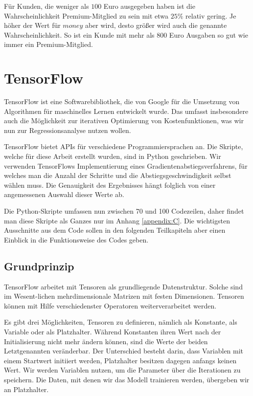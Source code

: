 Für Kunden, die weniger als $100$ Euro ausgegeben haben ist die Wahrscheinlichkeit Premium-Mitglied zu sein mit etwa $25\%$ relativ gering. Je höher der Wert für $money$ aber wird, desto größer wird auch die genannte Wahrscheinlichkeit. So ist ein Kunde mit mehr als $800$ Euro Ausgaben so gut wie immer ein Premium-Mitglied.

\section{TensorFlow}
\label{section:3:3}

TensorFlow ist eine Softwarebibliothek, die von Google für die Umsetzung von Algorithmen für maschinelles Lernen entwickelt wurde. Das umfasst insbesondere auch die Möglichkeit zur iterativen Optimierung von Kostenfunktionen, was wir nun zur Regressionsanalyse nutzen wollen.

TensorFlow bietet APIs für verschiedene Programmiersprachen an. Die Skripte, \linebreak welche für diese Arbeit erstellt wurden, sind in Python geschrieben. Wir verwenden \linebreak TensorFlows Implementierung eines Gradientenabstiegsverfahrens, für welches man die Anzahl der Schritte und die Abstiegsgeschwindigkeit selbst wählen muss. Die Genauigkeit des Ergebnisses hängt folglich von einer angemessenen Auswahl dieser Werte ab.

Die Python-Skripte umfassen nun zwischen 70 und 100 Codezeilen, daher findet man diese Skripte als Ganzes nur im Anhang \ref{appendix:C}. Die wichtigsten Ausschnitte aus dem Code sollen in den folgenden Teilkapiteln aber einen Einblick in die Funktionsweise des Codes geben.

\subsection{Grundprinzip}
\label{subsection:3:3:1}

TensorFlow arbeitet mit Tensoren als grundliegende Datenstruktur. Solche sind im Wesent-lichen mehrdimensionale Matrizen mit festen Dimensionen. Tensoren können mit Hilfe verschiedenster Operatoren weiterverarbeitet werden.

Es gibt drei Möglichkeiten, Tensoren zu definieren, nämlich als Konstante, als Variable oder als Platzhalter. Während Konstanten ihren Wert nach der Initialisierung nicht mehr ändern können, sind die Werte der beiden Letztgenannten veränderbar. Der Unterschied besteht darin, dass Variablen mit einem Startwert initiiert werden, Platzhalter besitzen dagegen anfangs keinen Wert. Wir werden Variablen nutzen, um die Parameter über die Iterationen zu speichern. Die Daten, mit denen wir das Modell trainieren werden, übergeben wir an Platzhalter.

